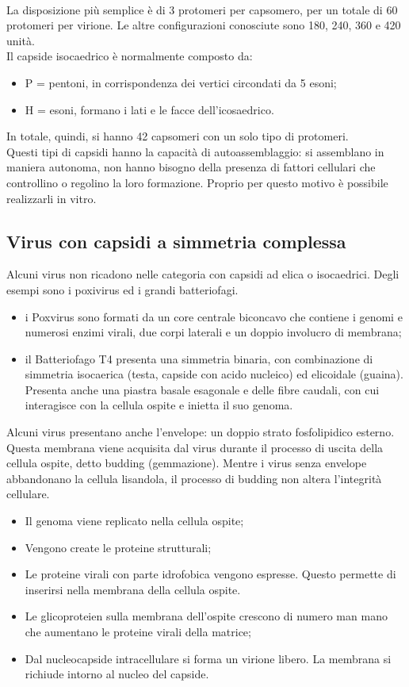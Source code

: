 \\La disposizione pi\`u semplice \`e di 3 protomeri per capsomero, per un totale di 60 protomeri per virione. Le altre configurazioni conosciute sono 180, 240, 360 e 420 unit\`a.  
\\Il capside isocaedrico \`e normalmente composto da: \begin{itemize}
    \item P = pentoni, in corrispondenza dei vertici
    circondati da 5 esoni;
    \item H = esoni, formano i lati e le facce dell'icosaedrico. 
\end{itemize}
In totale, quindi, si hanno 42 capsomeri con un solo tipo di protomeri.
\\Questi tipi di capsidi hanno la capacit\`a di autoassemblaggio: si assemblano in maniera autonoma, non hanno bisogno della presenza di fattori cellulari che controllino o regolino la loro formazione. Proprio per questo motivo \`e possibile realizzarli in vitro.
\subsection{Virus con capsidi a simmetria complessa}
Alcuni virus non ricadono nelle categoria con capsidi ad elica o isocaedrici. Degli esempi sono i poxivirus ed i grandi batteriofagi. 
\begin{itemize}
    \item i Poxvirus sono formati da un core centrale biconcavo che contiene i genomi e numerosi enzimi virali, due corpi laterali e un doppio involucro di membrana; 
    \item il Batteriofago T4 presenta una simmetria binaria, con combinazione di simmetria isocaerica (testa, capside con acido nucleico) ed elicoidale (guaina). Presenta anche una piastra basale esagonale e delle fibre caudali, con cui interagisce con la cellula ospite e inietta il suo genoma.
\end{itemize}
Alcuni virus presentano anche l'envelope: un doppio strato fosfolipidico esterno. Questa membrana viene acquisita dal virus durante il processo di uscita della cellula ospite, detto budding (gemmazione). Mentre i virus senza envelope abbandonano la cellula lisandola, il processo di budding non altera l'integrit\`a cellulare.
\begin{itemize}
    \item Il genoma viene replicato nella cellula ospite; 
    \item Vengono create le proteine strutturali; 
    \item Le proteine virali con parte idrofobica vengono espresse. Questo permette di inserirsi nella membrana della cellula ospite.
    \item Le glicoproteien sulla membrana dell'ospite crescono di numero man mano che aumentano le proteine virali della matrice;
    \item Dal nucleocapside intracellulare si forma un virione libero. La membrana si richiude intorno al nucleo del capside.
\end{itemize}
